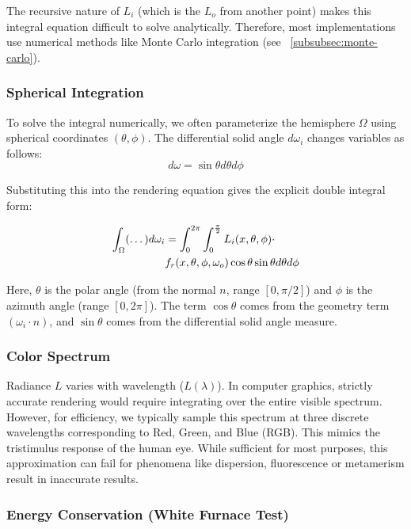 The recursive nature of $L_i$ (which is the $L_o$ from another point)
makes this integral equation difficult to solve analytically.
Therefore, most implementations use numerical methods like Monte Carlo integration (see ~\ref{subsubsec:monte-carlo}).

\subsubsection{Spherical Integration}

To solve the integral numerically, we often parameterize the hemisphere $\Omega$
using spherical coordinates $(\theta, \phi)$.
The differential solid angle $d\omega_i$ changes variables as follows:
\begin{equation}
    d\omega = \sin\theta d\theta d\phi\label{eq:omega-cov}
\end{equation}

Substituting this into the rendering equation gives the explicit double integral form:

\begin{align}
    \int_{\Omega} (\dots) d\omega_i &= \int_{0}^{2\pi} \int_{0}^{\frac{\pi}{2}} L_i(x, \theta, \phi) \cdot \notag \\
    & f_r(x, \theta, \phi, \omega_o) \cos\theta \sin\theta d\theta d\phi
\end{align}

Here, $\theta$ is the polar angle (from the normal $n$, range $[0, \pi/2]$)
and $\phi$ is the azimuth angle (range $[0, 2\pi]$).
The term $\cos\theta$ comes from the geometry term $(\omega_i \cdot n)$,
and $\sin\theta$ comes from the differential solid angle measure.

\subsubsection{Color Spectrum}

Radiance $L$ varies with wavelength ($L(\lambda)$).
In computer graphics, strictly accurate rendering would require integrating over the entire visible spectrum.
However, for efficiency, we typically sample this spectrum at three discrete wavelengths corresponding to Red, Green,
and Blue (RGB).
This mimics the tristimulus response of the human eye.
While sufficient for most purposes, this approximation can fail for phenomena like
dispersion, fluorescence or metamerism result in inaccurate results.

\subsubsection{Energy Conservation (White Furnace Test)}

